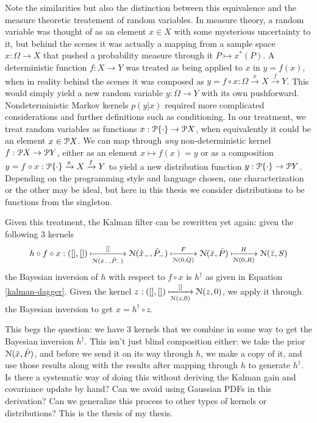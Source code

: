 Note the similarities but also the distinction between this equivalence and the measure theoretic treatement of random variables. In measure theory, a random variable was thought of as an element $x\in X$ with some mysterious uncertainty to it, but behind the scenes it was actually a mapping from a sample space $x:\Omega \rightarrow X$ that pushed a probability measure through it $P \mapsto x^*(P)$. A deterministic function $f:X\rightarrow Y$ was treated as being applied to $x$ in $y = f(x)$, when in reality behind the scenes it was composed as $y = f\circ x : \Omega \xrightarrow{x} X \xrightarrow{f} Y$. This would simply yield a new random variable $y:\Omega\rightarrow Y$ with its own pushforward. Nondeterministic Markov kernels $p(y|x)$ required more complicated considerations and further definitions such as conditioning. In our treatment, we treat random variables as functions $x:\mathcal{P} \{\cdot\} \rightarrow \mathcal{P} X$, when equivalently it could be an element $x\in\mathcal{P} X$. We can map through \emph{any} non-deterministic kernel $f:\mathcal{P} X \rightarrow \mathcal{P} Y$, either as an element $x\mapsto f(x) = y$ or as a composition $y = f\circ x : \mathcal{P}\{\cdot\} \xrightarrow{x} X \xrightarrow{f} Y$ to yield a new distribution function $y:\mathcal{P}\{\cdot\} \rightarrow \mathcal{P} Y$. Depending on the programming style and language chosen, one characterization or the other may be ideal, but here in this thesis we consider distributions to be functions from the singleton.

Given this treatment, the Kalman filter can be rewritten yet again: given the following 3 kernels
\begin{equation}
    \label{kalman-mappings}
    h\circ f\circ x:
    ([],[])
    \xmapsto[\mathcal{N}(\hat{x}_-, \hat{P}_-)]{[]}
    \mathcal{N}(\hat{x}_-, \hat{P}_-)
    \xmapsto[\mathcal{N}(0,Q)]{F}
    \mathcal{N}(\bar{x}, \bar{P})
    \xmapsto[\mathcal{N}(0,R)]{H}
    \mathcal{N}(\bar{z}, S)
\end{equation}
the Bayesian inversion of $h$ with respect to $f\circ x$ is $h^\dagger$ as given in Equation \ref{kalman-dagger}. Given the kernel $z : ([],[])\xmapsto[\mathcal{N}(z,0)]{[]} \mathcal{N}(z,0)$, we apply it through the Bayesian inversion to get $x = h^\dagger\circ z$.

This begs the question: we have 3 kernels that we combine in some way to get the Bayesian inversion $h^\dagger$. This isn't just blind composition either: we take the prior $\mathcal{N}(\bar{x}, \bar{P})$, and before we send it on its way through $h$, we make a copy of it, and use those results along with the results after mapping through $h$ to generate $h^\dagger$. Is there a systematic way of doing this without deriving the Kalman gain and covariance update by hand? Can we avoid using Gaussian PDFs in this derivation? Can we generalize this process to other types of kernels or distributions? This is the thesis of my thesis.

